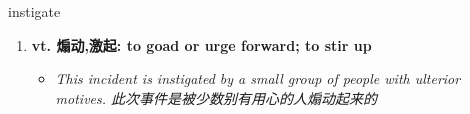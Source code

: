 
\begin{frame}
{\huge instigate}
\begin{center}
\begin{enumerate}\Large
  \item \textbf{vt. 煽动,激起: to goad or urge forward; to stir up}
  \begin{itemize}
    \item \em{\Large{This incident is instigated by a small group of people with ulterior motives. 此次事件是被少数别有用心的人煽动起来的}}
  \end{itemize}
\end{enumerate}
\end{center}
\end{frame}
